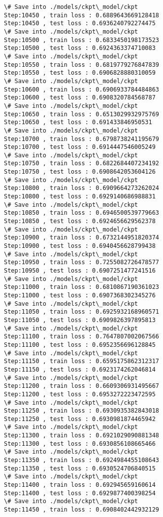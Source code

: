\documentclass[11pt]{article}
\begin{document}
\begin{Verbatim}[commandchars=\\\{\}]
\# Save into ./models/ckpt\_model/ckpt
Step:10450 , train loss : 0.6889643669128418
Step:10450 , test loss : 0.6936240792274475
\# Save into ./models/ckpt\_model/ckpt
Step:10500 , train loss : 0.6833450198173523
Step:10500 , test loss : 0.6924363374710083
\# Save into ./models/ckpt\_model/ckpt
Step:10550 , train loss : 0.6819779276847839
Step:10550 , test loss : 0.6906828880310059
\# Save into ./models/ckpt\_model/ckpt
Step:10600 , train loss : 0.6906933784484863
Step:10600 , test loss : 0.6908320784568787
\# Save into ./models/ckpt\_model/ckpt
Step:10650 , train loss : 0.6513029932975769
Step:10650 , test loss : 0.691433846950531
\# Save into ./models/ckpt\_model/ckpt
Step:10700 , train loss : 0.6798738241195679
Step:10700 , test loss : 0.6914447546005249
\# Save into ./models/ckpt\_model/ckpt
Step:10750 , train loss : 0.6822684407234192
Step:10750 , test loss : 0.6908642053604126
\# Save into ./models/ckpt\_model/ckpt
Step:10800 , train loss : 0.6909664273262024
Step:10800 , test loss : 0.6929140686988831
\# Save into ./models/ckpt\_model/ckpt
Step:10850 , train loss : 0.6946500539779663
Step:10850 , test loss : 0.6924656629562378
\# Save into ./models/ckpt\_model/ckpt
Step:10900 , train loss : 0.6732144951820374
Step:10900 , test loss : 0.6940456628799438
\# Save into ./models/ckpt\_model/ckpt
Step:10950 , train loss : 0.7255082726478577
Step:10950 , test loss : 0.6907251477241516
\# Save into ./models/ckpt\_model/ckpt
Step:11000 , train loss : 0.6810867190361023
Step:11000 , test loss : 0.6907368302345276
\# Save into ./models/ckpt\_model/ckpt
Step:11050 , train loss : 0.6925932168960571
Step:11050 , test loss : 0.6909826397895813
\# Save into ./models/ckpt\_model/ckpt
Step:11100 , train loss : 0.7647807002067566
Step:11100 , test loss : 0.6952356696128845
\# Save into ./models/ckpt\_model/ckpt
Step:11150 , train loss : 0.6595175862312317
Step:11150 , test loss : 0.6923174262046814
\# Save into ./models/ckpt\_model/ckpt
Step:11200 , train loss : 0.6609306931495667
Step:11200 , test loss : 0.6953272223472595
\# Save into ./models/ckpt\_model/ckpt
Step:11250 , train loss : 0.6930935382843018
Step:11250 , test loss : 0.6930981874465942
\# Save into ./models/ckpt\_model/ckpt
Step:11300 , train loss : 0.6921029090881348
Step:11300 , test loss : 0.6930856108665466
\# Save into ./models/ckpt\_model/ckpt
Step:11350 , train loss : 0.6924984455108643
Step:11350 , test loss : 0.6930524706840515
\# Save into ./models/ckpt\_model/ckpt
Step:11400 , train loss : 0.692945659160614
Step:11400 , test loss : 0.6929877400398254
\# Save into ./models/ckpt\_model/ckpt
Step:11450 , train loss : 0.6908402442932129

\end{Verbatim}
\end{document}

